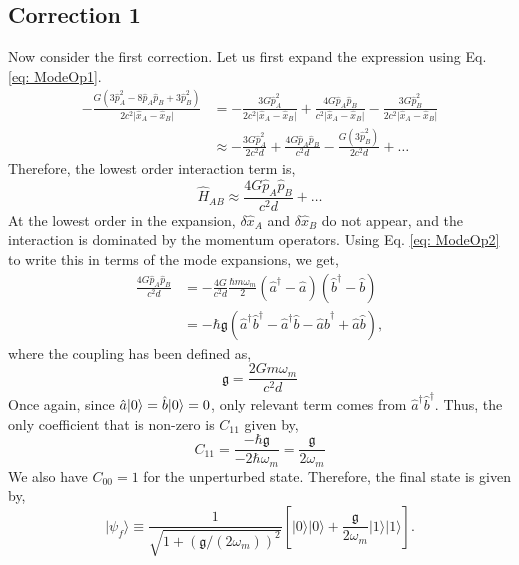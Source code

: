 \documentclass[12pt,a4paper]{report}
\theoremstyle{plain}
\theoremstyle{definition}
\theoremstyle{remark}
\renewcommand{\dag}{\dagger}
\newcommand{\Hab}{\hat{H}_{AB}}
\newcommand{\ahat}{\hat{a}}
\newcommand{\bhat}{\hat{b}}
\newcommand{\g}{\mathfrak{g}}
\DeclarePairedDelimiter\ket{\lvert}{\rangle}
\begin{document}
\subsection{Correction 1}
Now consider the first correction. Let us first expand the expression using Eq. \ref{eq: ModeOp1}.
\begin{equation}
   \begin{aligned}
        -\frac{G(3{\hat{p}}_{A}^{2}-8\hat{p}_{A}\hat{p}_{B}+3{\hat{p}}_{B}^{2})}{2c^{2}\vert{\hat{x}}_{A}-{\hat{x}}_{B}\vert} &=  -\frac{3G{\hat{p}}_{A}^{2}}{2c^{2}\vert{\hat{x}}_{A}-{\hat{x}}_{B}\vert} + \frac{4G\hat{p}_{A}\hat{p}_{B}}{c^{2}\vert{\hat{x}}_{A}-{\hat{x}}_{B}\vert} - \frac{3G{\hat{p}}_{B}^{2}}{2c^{2}\vert{\hat{x}}_{A}-{\hat{x}}_{B}\vert}\\
        &\approx -\frac{3G{\hat{p}}_{A}^{2}}{2c^{2}d} + \frac{4G\hat{p}_{A}\hat{p}_{B}}{c^{2}d} - \frac{G(3{\hat{p}}_{B}^{2})}{2c^{2}d} + \ldots
   \end{aligned} 
\end{equation}
Therefore, the lowest order interaction term is,
\begin{equation}
    \Hab  \approx \frac{4G\hat{p}_{A}\hat{p}_{B}}{c^{2}d} + \ldots
\end{equation}
At the lowest order in the expansion, $\delta\hat{x}_{A}$ and $\delta\hat{x}_{B}$ do not appear, and the interaction is dominated by the momentum operators. Using Eq. \ref{eq: ModeOp2} to write this in terms of the mode expansions, we get,
\begin{equation}
    \begin{aligned}
        \frac{4G\hat{p}_{A}\hat{p}_{B}}{c^{2}d} &= - \frac{4G}{c^{2}d} \frac{\hbar m \omega_m}{2}(\ahat^{\dag} - \ahat)(\bhat^{\dag} - \bhat) \\
        &= -\hbar\g(\ahat^{\dag}\bhat^{\dag} - \ahat^{\dag}\bhat - \ahat\bhat^{\dag} + \ahat\bhat),
    \end{aligned}
\end{equation}
where the coupling has been  defined as,
\begin{equation}
    \g = \frac{2Gm\omega_m}{c^2d}
\end{equation}
Once again, since $\ahat\ket{0} = \bhat\ket{0} = 0$, only relevant term comes from $\ahat^{\dag}\bhat^{\dag}$.
Thus, the only coefficient that is non-zero is $C_{11}$ given by,
\begin{equation}
    C_{11} = \frac{-\hbar\g}{-2\hbar\omega_m} = \frac{\g}{2\omega_m}
\end{equation}
We also have $C_{00} = 1$ for the unperturbed state. Therefore, the final state is given by,
\begin{equation} \label{eq: finalns1}
    \vert\psi_{f}\rangle\equiv\frac{1}{\sqrt{1+(\mathfrak{g}/(2\omega_{m}))^{2}}}[\vert0\rangle\vert0\rangle+\frac{\mathfrak{g}}{2\omega_{m}}\vert1\rangle\vert1\rangle].
\end{equation}
\end{document}
